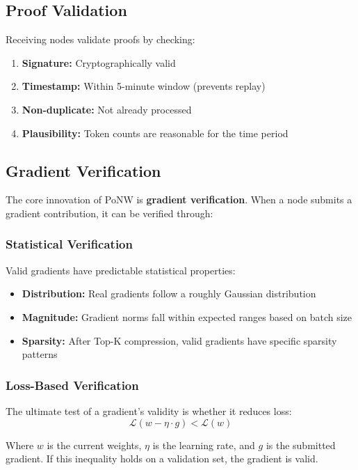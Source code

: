 \documentclass[11pt,a4paper]{article}
\begin{document}
\subsection{Proof Validation}

Receiving nodes validate proofs by checking:

\begin{enumerate}
    \item \textbf{Signature:} Cryptographically valid
    \item \textbf{Timestamp:} Within 5-minute window (prevents replay)
    \item \textbf{Non-duplicate:} Not already processed
    \item \textbf{Plausibility:} Token counts are reasonable for the time period
\end{enumerate}

\subsection{Gradient Verification}

The core innovation of PoNW is \textbf{gradient verification}. When a node submits a gradient contribution, it can be verified through:

\subsubsection{Statistical Verification}
Valid gradients have predictable statistical properties:
\begin{itemize}
    \item \textbf{Distribution:} Real gradients follow a roughly Gaussian distribution
    \item \textbf{Magnitude:} Gradient norms fall within expected ranges based on batch size
    \item \textbf{Sparsity:} After Top-K compression, valid gradients have specific sparsity patterns
\end{itemize}

\subsubsection{Loss-Based Verification}
The ultimate test of a gradient's validity is whether it reduces loss:
\begin{equation}
\mathcal{L}(w - \eta \cdot g) < \mathcal{L}(w)
\end{equation}

Where $w$ is the current weights, $\eta$ is the learning rate, and $g$ is the submitted gradient. If this inequality holds on a validation set, the gradient is valid.
\end{document}
